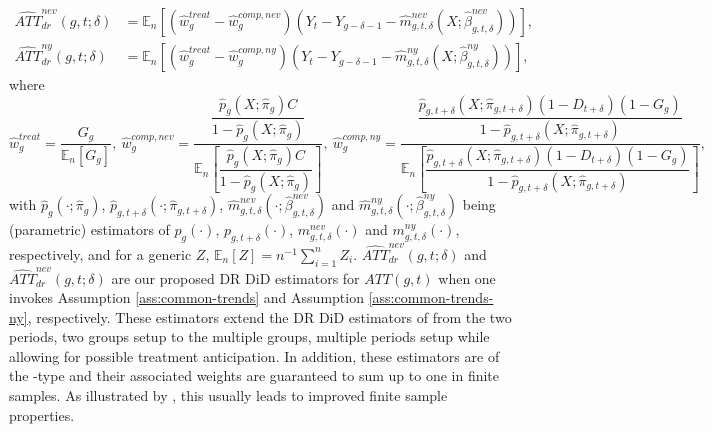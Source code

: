 \documentclass[11pt]{article}%
\theoremstyle{plain}
\numberwithin{sassumption}{section}
\numberwithin{equation}{section}
\begin{document}
\begin{align}
\widehat{ATT}_{dr}^{nev}\left(  g,t;\delta\right)   &  =\mathbb{E}_{n}\left[
\left(  \widehat{w}_{g}^{treat}-\widehat{w}_{g}^{comp,nev}\right)  \left(
Y_{t}-Y_{g-\delta-1}-\widehat{m}_{g,t,\delta}^{nev}\left(  X;\widehat{\beta
}_{g,t,\delta}^{nev}\right)  \right)  \right]  ,\label{eqn:ATT_dr_never}\\
\widehat{ATT}_{dr}^{ny}\left(  g,t;\delta\right)   &  =\mathbb{E}_{n}\left[
\left(  \widehat{w}_{g}^{treat}-\widehat{w}_{g}^{comp,ny}\right)  \left(
Y_{t}-Y_{g-\delta-1}-\widehat{m}_{g,t,\delta}^{ny}\left(  X;\widehat{\beta
}_{g,t,\delta}^{ny}\right)  \right)  \right]  , \label{eqn:ATT_dr_ny}%
\end{align}
where 
\small\[
\widehat{w}_{g}^{treat}=\frac{G_{g}}{\mathbb{E}_{n}\left[  G_{g}\right]
},~\widehat{w}_{g}^{comp,nev}=\frac{\dfrac{\widehat{p}_{g}\left(
X;\widehat{\pi}_{g}\right)  C}{1-\widehat{p}_{g}\left(  X;\widehat{\pi}%
_{g}\right)  }}{\mathbb{E}_{n}\left[  \dfrac{\widehat{p}_{g}\left(
X;\widehat{\pi}_{g}\right)  C}{1-\widehat{p}_{g}\left(  X;\widehat{\pi}%
_{g}\right)  }\right]  },~\widehat{w}_{g}^{comp,ny}=\frac{\dfrac
{\widehat{p}_{g,t+\delta}\left(  X;\widehat{\pi}_{g,t+\delta}\right)  \left(
1-D_{t+\delta}\right)  \left(  1-G_{g}\right)  }{1-\widehat{p}_{g,t+\delta
}\left(  X;\widehat{\pi}_{g,t+\delta}\right)  }}{\mathbb{E}_{n}\left[
\dfrac{\widehat{p}_{g,t+\delta}\left(  X;\widehat{\pi}_{g,t+\delta}\right)
\left(  1-D_{t+\delta}\right)  \left(  1-G_{g}\right)  }{1-\widehat{p}%
_{g,t+\delta}\left(  X;\widehat{\pi}_{g,t+\delta}\right)  }\right]  },
\]
\normalsize
with $\widehat{p}_{g}\left(  \cdot;\widehat{\pi}_{g}\right)  $,
$\widehat{p}_{g,t+\delta}(\cdot;\widehat{\pi}_{g,t+\delta})$, $\widehat{m}%
_{g,t,\delta}^{nev}(\cdot;\widehat{\beta}_{g,t,\delta}^{nev})$ and
$\widehat{m}_{g,t,\delta}^{ny}(\cdot;\widehat{\beta}_{g,t,\delta}^{ny})$ being
(parametric) estimators of $p_{g}(\cdot)$, $p_{g,t+\delta}(\cdot)$,
$m_{g,t,\delta}^{nev}(\cdot)$ and $m_{g,t,\delta}^{ny}(\cdot)$, respectively,
and for a generic $Z$, $\mathbb{E}_{n}\left[  Z\right]  =n^{-1}\sum_{i=1}%
^{n}Z_{i}$. $\widehat{ATT}_{dr}^{nev}\left(  g,t;\delta\right)  $ and
$\widehat{ATT}_{dr}^{nev}\left(  g,t;\delta\right)  $ are our proposed DR DiD 
estimators for $ATT\left(  g,t\right)  $ when one invokes Assumption
\ref{ass:common-trends} and Assumption \ref{ass:common-trends-ny},
respectively. These estimators extend the DR DiD estimators of
\cite{SantAnna2020} from the two periods, two groups setup to the multiple
groups, multiple periods setup while allowing for possible treatment
anticipation. In addition, these estimators are of the \cite{Hajek1971}-type
and their associated weights are guaranteed to sum up to one in finite
samples. As illustrated by \cite{Busso2014}, this usually leads to improved
finite sample properties.
\end{document}
